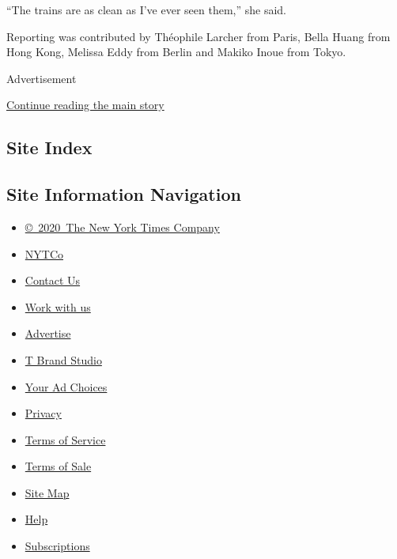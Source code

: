 ``The trains are as clean as I've ever seen them,'' she said.

Reporting was contributed by Théophile Larcher from Paris, Bella Huang
from Hong Kong, Melissa Eddy from Berlin and Makiko Inoue from Tokyo.

Advertisement

\protect\hyperlink{after-bottom}{Continue reading the main story}

\hypertarget{site-index}{%
\subsection{Site Index}\label{site-index}}

\hypertarget{site-information-navigation}{%
\subsection{Site Information
Navigation}\label{site-information-navigation}}

\begin{itemize}
\tightlist
\item
  \href{https://help.nytimes3xbfgragh.onion/hc/en-us/articles/115014792127-Copyright-notice}{©~2020~The
  New York Times Company}
\end{itemize}

\begin{itemize}
\tightlist
\item
  \href{https://www.nytco.com/}{NYTCo}
\item
  \href{https://help.nytimes3xbfgragh.onion/hc/en-us/articles/115015385887-Contact-Us}{Contact
  Us}
\item
  \href{https://www.nytco.com/careers/}{Work with us}
\item
  \href{https://nytmediakit.com/}{Advertise}
\item
  \href{http://www.tbrandstudio.com/}{T Brand Studio}
\item
  \href{https://www.nytimes3xbfgragh.onion/privacy/cookie-policy\#how-do-i-manage-trackers}{Your
  Ad Choices}
\item
  \href{https://www.nytimes3xbfgragh.onion/privacy}{Privacy}
\item
  \href{https://help.nytimes3xbfgragh.onion/hc/en-us/articles/115014893428-Terms-of-service}{Terms
  of Service}
\item
  \href{https://help.nytimes3xbfgragh.onion/hc/en-us/articles/115014893968-Terms-of-sale}{Terms
  of Sale}
\item
  \href{https://spiderbites.nytimes3xbfgragh.onion}{Site Map}
\item
  \href{https://help.nytimes3xbfgragh.onion/hc/en-us}{Help}
\item
  \href{https://www.nytimes3xbfgragh.onion/subscription?campaignId=37WXW}{Subscriptions}
\end{itemize}
